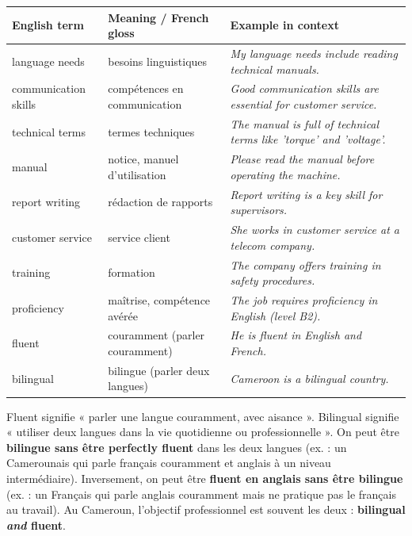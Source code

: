 \documentclass[11pt]{article}
\newcommand{\cle}[1]{{\popxbold\color{popdark}#1}}
\begin{document}
\begin{center}
\begin{tabularx}{\linewidth}{|l|X|X|}
\hline
\rowcolor{popblueL}
\textbf{English term} & \textbf{Meaning / French gloss} & \textbf{Example in context} \\
\hline
\cle{language needs} & besoins linguistiques & \emph{My language needs include reading technical manuals.} \\
\cle{communication skills} & compétences en communication & \emph{Good communication skills are essential for customer service.} \\
\cle{technical terms} & termes techniques & \emph{The manual is full of technical terms like 'torque' and 'voltage'.} \\
\cle{manual} & notice, manuel d'utilisation & \emph{Please read the manual before operating the machine.} \\
\cle{report writing} & rédaction de rapports & \emph{Report writing is a key skill for supervisors.} \\
\cle{customer service} & service client & \emph{She works in customer service at a telecom company.} \\
\cle{training} & formation & \emph{The company offers training in safety procedures.} \\
\cle{proficiency} & maîtrise, compétence avérée & \emph{The job requires proficiency in English (level B2).} \\
\cle{fluent} & couramment (parler couramment) & \emph{He is fluent in English and French.} \\
\cle{bilingual} & bilingue (parler deux langues) & \emph{Cameroon is a bilingual country.} \\
\hline
\end{tabularx}
\end{center}

\begin{attention}
\cle{Fluent} signifie « parler une langue couramment, avec aisance ». \cle{Bilingual} signifie « utiliser deux langues dans la vie quotidienne ou professionnelle ». On peut être \textbf{bilingue sans être perfectly fluent} dans les deux langues (ex. : un Camerounais qui parle français couramment et anglais à un niveau intermédiaire). Inversement, on peut être \textbf{fluent en anglais sans être bilingue} (ex. : un Français qui parle anglais couramment mais ne pratique pas le français au travail). Au Cameroun, l'objectif professionnel est souvent les deux : \textbf{bilingual \emph{and} fluent}.
\end{attention}
\end{document}
